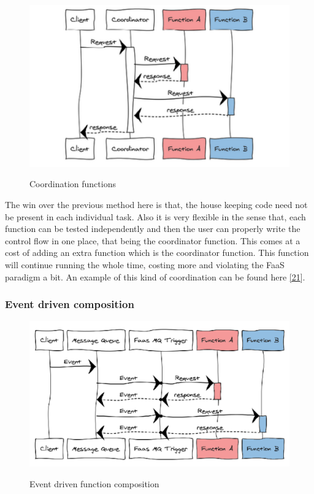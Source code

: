 \documentclass[12pt,titlepage]{article}
\begin{document}
\begin{figure}
\caption{Coordination functions}
\centering
\includegraphics[width=150mm]{./thesis_images/coordination.png}
\label{fig:Coordination}
\end{figure}

The win over the previous method here is that, the house keeping code need not
be present in each individual task. Also it is very flexible in the sense that,
each function can be tested independently and then the user can properly write
the control flow in one place, that being the coordinator function. This comes
at a cost of adding an extra function which is the coordinator function. This
function will continue running the whole time, costing more and violating the
FaaS paradigm a bit. An example of this kind of coordination can be found here \hyperref[ref:21]{[21}].


\subsubsection{Event driven composition}
\label{sec:org34faabd}

\begin{figure}
\caption{Event driven function composition}
\centering
\includegraphics[width=150mm]{./thesis_images/event.png}
\label{fig:Event}
\end{figure}
\end{document}
